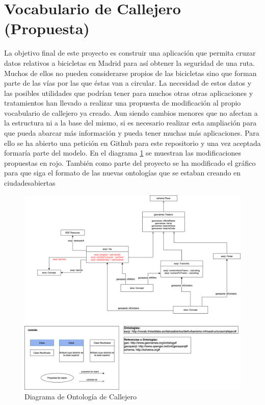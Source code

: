 \section{Vocabulario de Callejero (Propuesta)}

La objetivo final de este proyecto es construir una aplicación que permita cruzar datos relativos a bicicletas en Madrid para así obtener la seguridad de una ruta. Muchos de ellos no pueden considerarse propios de las bicicletas sino que forman parte de las vías por las que éstas van a circular. La necesidad de estos datos y las posibles utilidades que podrían tener para muchos otras otras aplicaciones y tratamientos han llevado a realizar una propuesta de modificación al propio vocabulario de callejero ya creado.\newline
Aun siendo cambios menores que no afectan a la estructura ni a la base del mismo, si es necesario realizar esta ampliación para que pueda abarcar más información y pueda tener muchas más aplicaciones.\newline
Para ello se ha abierto una petición en Github para este repositorio y una vez aceptada formaría parte del modelo.
\newline
\newline
En el diagrama \ref{fig:diagramaOntologCicloCarr} se muestran las modificaciones propuestas en rojo. También como parte del proyecto se ha modificado el gráfico para que siga el formato de las nuevas ontologías que se estaban creando en ciudadesabiertas \cite{ciudadesabiertas_catalogoVocabs}

\begin{figure}[h]
	\centering
		\includegraphics[angle=0, width=1\textwidth]{images/diagramaCallejero.png}  
	\caption{Diagrama de Ontología de Callejero}
	\label{fig:diagramaOntologCicloCarr}
\end{figure}


